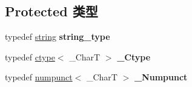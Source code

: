 \subsection*{Protected 类型}
\begin{DoxyCompactItemize}
\item 
\mbox{\label{classnum__get_a2a725a7a7472811e533171a09d6dd317}} 
typedef \hyperlink{structstring}{string} {\bfseries string\+\_\+type}
\item 
\mbox{\label{classnum__get_ab852bb9d811de4187788ff5efc5436b7}} 
typedef \hyperlink{classctype}{ctype}$<$ \+\_\+\+CharT $>$ {\bfseries \+\_\+\+Ctype}
\item 
\mbox{\label{classnum__get_a739c7ab7add6d26b5235832224049b72}} 
typedef \hyperlink{classnumpunct}{numpunct}$<$ \+\_\+\+CharT $>$ {\bfseries \+\_\+\+Numpunct}
\end{DoxyCompactItemize}
